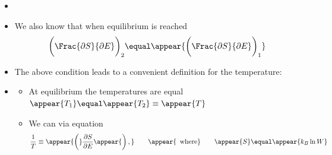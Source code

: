 \begin{frame}
\frametitle{\texorpdfstring{\culine[\sectiontitleulinecolor]{\sectiontitle}}{\sectiontitle} }

\begin{itemize}
	\item {}

\item We also know that when equilibrium is reached 
\[ 
  \bigg(  \Frac{\partial S}{\partial E}  \bigg)_{2} \equal  \appear{ \bigg( \Frac{\partial S}{\partial E}  \bigg)_{1}} 
 \]
\item The above condition leads to a convenient definition for the temperature: 

\item[] \begin{itemize}
	\item At equilibrium the temperatures are equal $\appear{T_1}  \equal  \appear{ T_2} \equiv \appear{T}$
	\item We can  via equation 
	 \[
	 \frac{1}{T} \equiv \appear{\bigg(} \frac{\partial S}{\partial E} \appear{\bigg)\,,} \qquad \appear{\,\textrm{~where}} \qquad \appear{S}  \equal \appear{k_{B} \ln W}
	 \]
\end{itemize}
\end{itemize}
 
 
\endofslide 
\end{frame}

